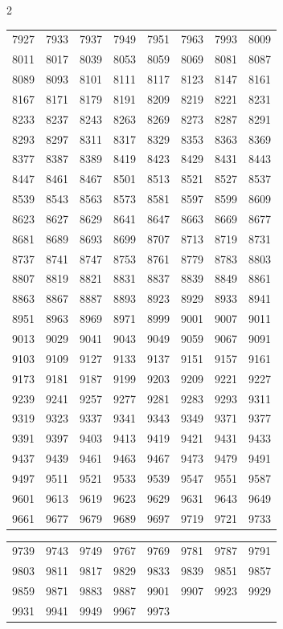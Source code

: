 \documentclass{article}
\begin{document}
\begin{multicols}{2}
\begin{tabular}{r r r r r r r r}
7927 & 7933 & 7937 & 7949 & 7951 & 7963 & 7993 & 8009\\
8011 & 8017 & 8039 & 8053 & 8059 & 8069 & 8081 & 8087\\
8089 & 8093 & 8101 & 8111 & 8117 & 8123 & 8147 & 8161\\
8167 & 8171 & 8179 & 8191 & 8209 & 8219 & 8221 & 8231\\
8233 & 8237 & 8243 & 8263 & 8269 & 8273 & 8287 & 8291\\
8293 & 8297 & 8311 & 8317 & 8329 & 8353 & 8363 & 8369\\
8377 & 8387 & 8389 & 8419 & 8423 & 8429 & 8431 & 8443\\
8447 & 8461 & 8467 & 8501 & 8513 & 8521 & 8527 & 8537\\
8539 & 8543 & 8563 & 8573 & 8581 & 8597 & 8599 & 8609\\
8623 & 8627 & 8629 & 8641 & 8647 & 8663 & 8669 & 8677\\
8681 & 8689 & 8693 & 8699 & 8707 & 8713 & 8719 & 8731\\
8737 & 8741 & 8747 & 8753 & 8761 & 8779 & 8783 & 8803\\
8807 & 8819 & 8821 & 8831 & 8837 & 8839 & 8849 & 8861\\
8863 & 8867 & 8887 & 8893 & 8923 & 8929 & 8933 & 8941\\
8951 & 8963 & 8969 & 8971 & 8999 & 9001 & 9007 & 9011\\
9013 & 9029 & 9041 & 9043 & 9049 & 9059 & 9067 & 9091\\
9103 & 9109 & 9127 & 9133 & 9137 & 9151 & 9157 & 9161\\
9173 & 9181 & 9187 & 9199 & 9203 & 9209 & 9221 & 9227\\
9239 & 9241 & 9257 & 9277 & 9281 & 9283 & 9293 & 9311\\
9319 & 9323 & 9337 & 9341 & 9343 & 9349 & 9371 & 9377\\
9391 & 9397 & 9403 & 9413 & 9419 & 9421 & 9431 & 9433\\
9437 & 9439 & 9461 & 9463 & 9467 & 9473 & 9479 & 9491\\
9497 & 9511 & 9521 & 9533 & 9539 & 9547 & 9551 & 9587\\
9601 & 9613 & 9619 & 9623 & 9629 & 9631 & 9643 & 9649\\
9661 & 9677 & 9679 & 9689 & 9697 & 9719 & 9721 & 9733\\
\end{tabular}

\begin{tabular}{r r r r r r r r}
9739 & 9743 & 9749 & 9767 & 9769 & 9781 & 9787 & 9791\\
9803 & 9811 & 9817 & 9829 & 9833 & 9839 & 9851 & 9857\\
9859 & 9871 & 9883 & 9887 & 9901 & 9907 & 9923 & 9929\\
9931 & 9941 & 9949 & 9967 & 9973\\
\end{tabular}


\end{multicols}
\end{document}
